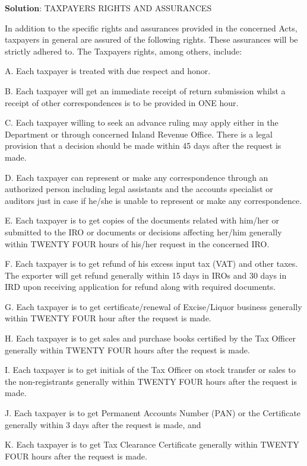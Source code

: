 \documentclass[
  openany]{book}
\newenvironment{solution}{ {\bfseries Solution}:}{}
\begin{document}
\begin{questions}
\begin{solution}
TAXPAYERS RIGHTS AND ASSURANCES

In addition to the specific rights and assurances provided in the concerned Acts, taxpayers in general are assured of the following rights. These assurances will be strictly adhered to. The Taxpayers rights, among others, include:

A. Each taxpayer is treated with due respect and honor.

B. Each taxpayer will get an immediate receipt of return submission whilst a receipt of other correspondences is to be provided in ONE hour.

C. Each taxpayer willing to seek an advance ruling may apply either in the Department or through concerned Inland Revenue Office. There is a legal provision that a decision should be made within 45 days after the request is made.

D. Each taxpayer can represent or make any correspondence through an authorized person including legal assistants and the accounts specialist or auditors just in case if he/she is unable to represent or make any correspondence.

E. Each taxpayer is to get copies of the documents related with him/her or submitted to the IRO or documents or decisions affecting her/him generally within TWENTY FOUR hours of his/her request in the concerned IRO.

F. Each taxpayer is to get refund of his excess input tax (VAT) and other taxes. The exporter will get refund generally within 15 days in IROs and 30 days in IRD upon receiving application for refund along with required documents.

G. Each taxpayer is to get certificate/renewal of Excise/Liquor business generally within TWENTY FOUR hour after the request is made.

H. Each taxpayer is to get sales and purchase books certified by the Tax Officer generally within TWENTY FOUR hours after the request is made.

I. Each taxpayer is to get initials of the Tax Officer on stock transfer or sales to the non-registrants generally within TWENTY FOUR hours after the request is made.

J. Each taxpayer is to get Permanent Accounts Number (PAN) or the Certificate generally within 3 days after the request is made, and

K. Each taxpayer is to get Tax Clearance Certificate generally within TWENTY FOUR hours after the request is made.

\end{solution}

\end{questions}
\end{document}
